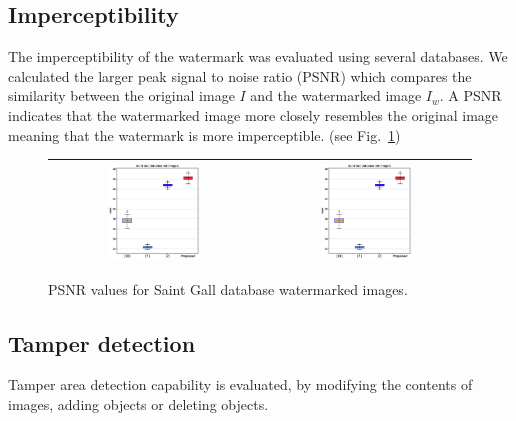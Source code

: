 \documentclass[runningheads]{llncs}
\begin{document}
\subsection{Imperceptibility}
The imperceptibility of the watermark was evaluated using several databases. We calculated the larger peak signal to noise ratio (PSNR) which compares the similarity between the original image $ I $ and the watermarked image $ I_w $. A PSNR indicates that the watermarked image more closely resembles the original image meaning that the watermark is more imperceptible. (see Fig.~\ref{psnr})
\begin{figure}[H]
	\begin{center}
		\begin{tabular}{|c|c|}\hline
			\includegraphics[width=0.45\textwidth]{PSNR_saintgall.eps}
			&\includegraphics[width=0.45\textwidth]{PSNR_saintgall.eps}\\\hline
		\end{tabular}
	\end{center}
	\caption{PSNR values for Saint Gall database watermarked images.}
	\label{psnr}
\end{figure}

\subsection{Tamper detection}
Tamper area detection capability is evaluated, by modifying the contents of images, adding objects or deleting objects.
\end{document}
